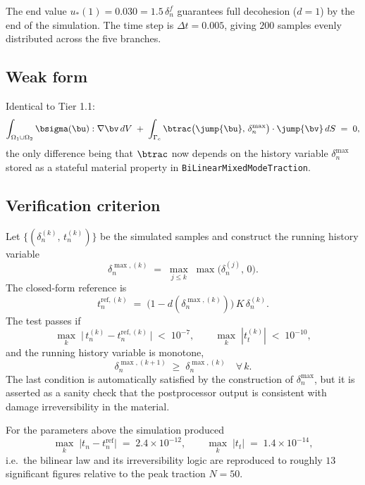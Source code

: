 The end value $u_*(1)=0.030 = 1.5\,\delta_n^{f}$ guarantees full decohesion
($d=1$) by the end of the simulation. The time step is
$\Delta t = 0.005$, giving $200$ samples evenly distributed across the
five branches.

\subsection{Weak form}

Identical to Tier 1.1:
\begin{equation}
\int_{\Omega_1\cup\Omega_2} \bsigma(\bu):\nabla\bv\,dV
\;+\;
\int_{\Gamma_c} \btrac\bigl(\jump{\bu},\,\delta_n^{\max}\bigr)\cdot
                \jump{\bv}\,dS
\;=\; 0,
\end{equation}
the only difference being that $\btrac$ now depends on the history variable
$\delta_n^{\max}$ stored as a stateful material property in
\texttt{BiLinearMixedModeTraction}.

\subsection{Verification criterion}

Let $\{(\delta_n^{(k)},\,t_n^{(k)})\}$ be the simulated samples and
construct the running history variable
\begin{equation}
\delta_n^{\max,(k)} \;=\; \max_{j\le k}\;\max\bigl(\delta_n^{(j)},\,0\bigr).
\end{equation}
The closed-form reference is
\begin{equation}
t_n^{\text{ref},(k)}
\;=\;
\bigl(1 - d(\delta_n^{\max,(k)})\bigr)\,K\,\delta_n^{(k)}.
\end{equation}
The test passes if
\begin{equation}
\max_{k}\;\bigl|\,t_n^{(k)} - t_n^{\text{ref},(k)}\,\bigr|
\;<\;10^{-7},
\qquad
\max_{k}\;|t_t^{(k)}|
\;<\;10^{-10},
\end{equation}
and the running history variable is monotone,
\begin{equation}
\delta_n^{\max,(k+1)} \;\ge\; \delta_n^{\max,(k)} \quad\forall\,k.
\end{equation}
The last condition is automatically satisfied by the construction of
$\delta_n^{\max}$, but it is asserted as a sanity check that the
postprocessor output is consistent with damage irreversibility in the
material.

For the parameters above the simulation produced
\begin{equation}
\max_{k}\;\bigl|t_n - t_n^{\text{ref}}\bigr| \;=\; 2.4\times 10^{-12},\qquad
\max_{k}\;|t_t| \;=\; 1.4\times 10^{-14},
\end{equation}
i.e.\ the bilinear law and its irreversibility logic are reproduced to
roughly $13$ significant figures relative to the peak traction $N=50$.


